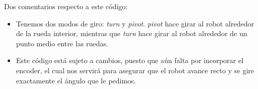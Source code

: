\documentclass[11pt, a4paper]{article}
\begin{document}
Dos comentarios respecto a este código:

\begin{itemize}
	\item Tenemos dos modos de giro: \textit{turn} y \textit{pivot}. \textit{pivot} hace girar al robot alrededor de la rueda interior, mientras que \textit{turn} hace girar al robot alrededor de un punto medio entre las ruedas.
	\item Este código está sujeto a cambios, puesto que aún falta por incorporar el encoder, el cual nos servirá para asegurar que el robot avance recto y se gire exactamente el ángulo que le pedimos.
\end{itemize}
\end{document}
